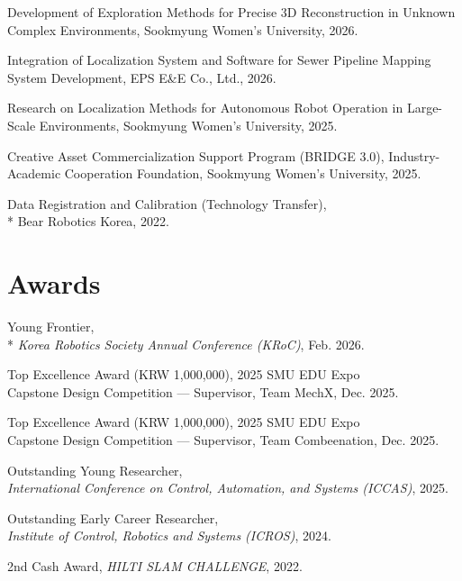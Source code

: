 \documentclass[margin]{res}
\begin{document}
\begin{resume}
		\par Development of Exploration Methods for Precise 3D Reconstruction in Unknown Complex Environments, Sookmyung Women's University, 2026.

		\par Integration of Localization System and Software for Sewer Pipeline Mapping System Development, EPS E\&E Co., Ltd., 2026.

		\par Research on Localization Methods for Autonomous Robot Operation in Large-Scale Environments, Sookmyung Women's University, 2025.

		\par Creative Asset Commercialization Support Program (BRIDGE 3.0), Industry-Academic Cooperation Foundation, Sookmyung Women's University, 2025.

		\par Data Registration and Calibration (Technology Transfer),\\*
		Bear Robotics Korea, 2022.

		\section{Awards}
		\par Young Frontier,\\*
		\textit{Korea Robotics Society Annual Conference (KRoC)}, Feb. 2026.

		\par Top Excellence Award (KRW 1,000,000), 2025 SMU EDU Expo\\
		Capstone Design Competition --- Supervisor, Team MechX, Dec. 2025.

		\par Top Excellence Award (KRW 1,000,000), 2025 SMU EDU Expo\\
		Capstone Design Competition --- Supervisor, Team Combeenation, Dec. 2025.

		\par Outstanding Young Researcher,\\
		\textit{International Conference on Control, Automation, and Systems (ICCAS)}, 2025.

		\par Outstanding Early Career Researcher,\\
		\textit{Institute of Control, Robotics and Systems (ICROS)}, 2024.

		\par 2nd Cash Award, \textit{HILTI SLAM CHALLENGE}, 2022.


\end{resume}
\end{document}
